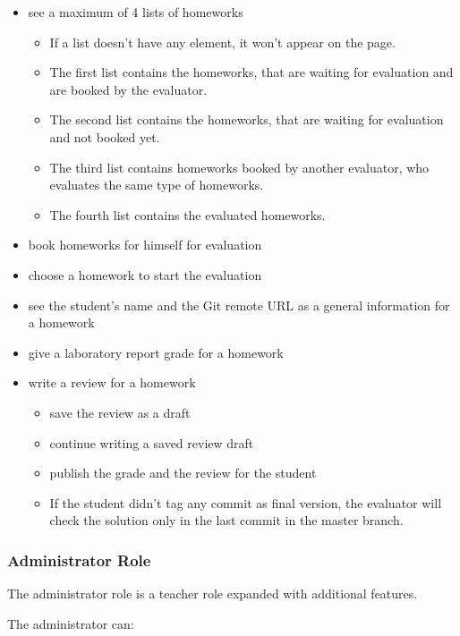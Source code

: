 \begin{itemize}
	\item see a maximum of 4 lists of homeworks
	\begin{itemize}
		\item If a list doesn't have any element, it won't appear on the page.
		\item The first list contains the homeworks, that are waiting for evaluation and are booked by the evaluator. 
		\item The second list contains the homeworks, that are waiting for evaluation and not booked yet. 
		\item The third list contains homeworks booked by another evaluator, who evaluates the same type of homeworks. 
		\item The fourth list contains the evaluated homeworks. 
	\end{itemize}
	\item book homeworks for himself for evaluation
	\item choose a homework to start the evaluation
	\item see the student's name and the Git remote URL as a general information for a homework
	\item give a laboratory report grade for a homework
	\item write a review for a homework
		\begin{itemize}
			\item save the review as a draft
			\item continue writing a saved review draft
			\item publish the grade and the review for the student
			\item If the student didn't tag any commit as final version, the evaluator will check the solution only in the last commit in the master branch.
		\end{itemize}
\end{itemize}

\subsubsection{Administrator Role}

The administrator role is a teacher role expanded with additional features.

The administrator can:

